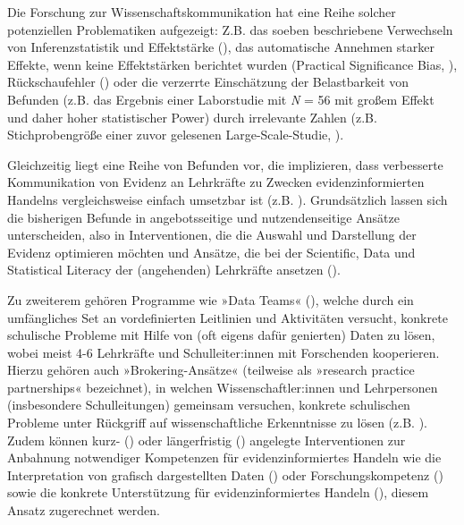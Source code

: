 \documentclass[
  jou,
  floatsintext,
  longtable,
  nolmodern,
  notxfonts,
  notimes,
  colorlinks=true,linkcolor=blue,citecolor=blue,urlcolor=blue]{apa7}
\begin{document}
Die Forschung zur Wissenschaftskommunikation hat eine Reihe solcher
potenziellen Problematiken aufgezeigt: Z.B. das soeben beschriebene
Verwechseln von Inferenzstatistik und Effektstärke
(), das automatische
Annehmen starker Effekte, wenn keine Effektstärken berichtet wurden
(Practical Significance Bias, ), Rückschaufehler () oder die verzerrte Einschätzung der Belastbarkeit von
Befunden (z.B. das Ergebnis einer Laborstudie mit \emph{N} = 56 mit
großem Effekt und daher hoher statistischer Power) durch irrelevante
Zahlen (z.B. Stichprobengröße einer zuvor gelesenen Large-Scale-Studie,
).

Gleichzeitig liegt eine Reihe von Befunden vor, die implizieren, dass
verbesserte Kommunikation von Evidenz an Lehrkräfte zu Zwecken
evidenzinformierten Handelns vergleichsweise einfach umsetzbar ist (z.B.
). Grundsätzlich
lassen sich die bisherigen Befunde in angebotsseitige und
nutzendenseitige Ansätze unterscheiden, also in Interventionen, die die
Auswahl und Darstellung der Evidenz optimieren möchten und Ansätze, die
bei der Scientific, Data und Statistical Literacy der (angehenden)
Lehrkräfte ansetzen ().

Zu zweiterem gehören Programme wie »Data Teams«
(), welche durch
ein umfängliches Set an vordefinierten Leitlinien und Aktivitäten
versucht, konkrete schulische Probleme mit Hilfe von (oft eigens dafür
genierten) Daten zu lösen, wobei meist 4-6 Lehrkräfte und
Schulleiter:innen mit Forschenden kooperieren. Hierzu gehören auch
»Brokering-Ansätze« (teilweise als »research practice partnerships«
bezeichnet), in welchen Wissenschaftler:innen und Lehrpersonen
(insbesondere Schulleitungen) gemeinsam versuchen, konkrete schulischen
Probleme unter Rückgriff auf wissenschaftliche Erkenntnisse zu lösen
(z.B. ). Zudem
können kurz- () oder
längerfristig () angelegte
Interventionen zur Anbahnung notwendiger Kompetenzen für
evidenzinformiertes Handeln wie die Interpretation von grafisch
dargestellten Daten () oder
Forschungskompetenz () sowie die konkrete Unterstützung für evidenzinformiertes Handeln
(),
diesem Ansatz zugerechnet werden.
\end{document}
